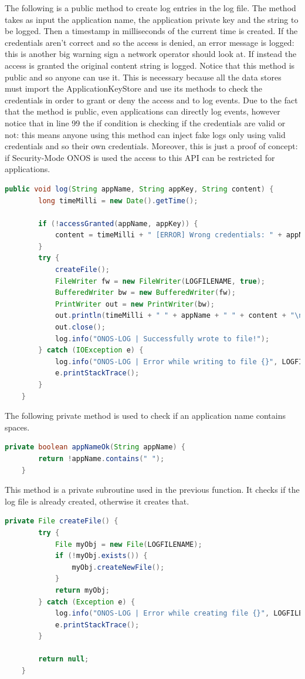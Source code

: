 The following is a public method to create log entries in the log file. The method takes as input the application name, the application private key and the string to be logged. Then a timestamp in milliseconds of the current time is created. If the credentials aren't correct and so the access is denied, an error message is logged: this is another big warning sign a network operator should look at. If instead the access is granted the original content string is logged. Notice that this method is public and so anyone can use it. This is necessary because all the data stores must import the ApplicationKeyStore and use its methods to check the credentials in order to grant or deny the access and to log events. Due to the fact that the method is public, even applications can directly log events, however notice that in line 99 the if condition is checking if the credentials are valid or not: this means anyone using this method can inject fake logs only using valid credentials and so their own credentials. Moreover, this is just a proof of concept: if Security-Mode ONOS is used the access to this API can be restricted for applications.
\begin{lstlisting}[language=java,firstnumber=107]
    public void log(String appName, String appKey, String content) {
        long timeMilli = new Date().getTime();

        if (!accessGranted(appName, appKey)) {
            content = timeMilli + " [ERROR] Wrong credentials: " + appName + " " + appKey + " " + content;
        }
        try {
            createFile();
            FileWriter fw = new FileWriter(LOGFILENAME, true);
            BufferedWriter bw = new BufferedWriter(fw);
            PrintWriter out = new PrintWriter(bw);
            out.println(timeMilli + " " + appName + " " + content + "\n");
            out.close();
            log.info("ONOS-LOG | Successfully wrote to file!");
        } catch (IOException e) {
            log.info("ONOS-LOG | Error while writing to file {}", LOGFILENAME);
            e.printStackTrace();
        }
    }
\end{lstlisting}

The following private method is used to check if an application name contains spaces.
\begin{lstlisting}[language=java,firstnumber=127]
    private boolean appNameOk(String appName) {
        return !appName.contains(" ");
    }
\end{lstlisting}

This method is a private subroutine used in the previous function. It checks if the log file is already created, otherwise it creates that.
\begin{lstlisting}[language=java,firstnumber=131]
    private File createFile() {
        try {
            File myObj = new File(LOGFILENAME);
            if (!myObj.exists()) {
                myObj.createNewFile();
            }
            return myObj;
        } catch (Exception e) {
            log.info("ONOS-LOG | Error while creating file {}", LOGFILENAME);
            e.printStackTrace();
        }

        return null;
    }
\end{lstlisting}

